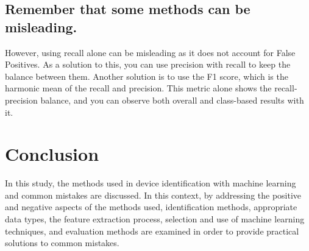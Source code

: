\documentclass[journal]{IEEEtran}
\begin{document}
\subsection{Remember that some methods can be misleading.}
However, using recall alone can be misleading as it does not account for False Positives. As a solution to this, you can use precision with recall to keep the balance between them. Another solution is to use the F1 score, which is the harmonic mean of the recall and precision. This metric alone shows the recall-precision balance, and you can observe both overall and class-based results with it.

\section{Conclusion}
In this study, the methods used in device identification with machine learning and common mistakes are discussed. In this context, by addressing the positive and negative aspects of the methods used, identification methods, appropriate data types, the feature extraction process, selection and use of machine learning techniques, and evaluation methods are examined in order to provide practical solutions to common mistakes.






\clearpage
\onecolumn
\end{document}

